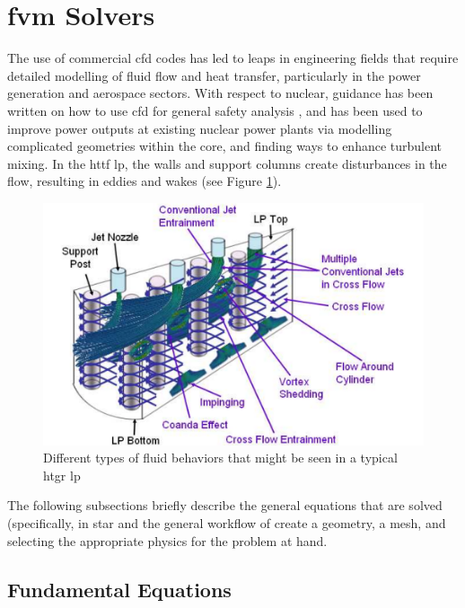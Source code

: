 \documentclass[double,12pt]{beavtex}
\begin{document}
\section{\acrshort{fvm} Solvers}

The use of commercial \acrshort{cfd} codes has led to leaps in engineering fields that require detailed modelling of fluid flow and heat transfer, particularly in the power generation and aerospace sectors. With respect to nuclear, guidance has been written on how to use \acrshort{cfd} for general safety analysis \cite{johnson_pointer}, and has been used to improve power outputs at existing nuclear power plants \cite{wang_wang_tian_qiu_su_2021} via modelling complicated geometries within the core, and finding ways to enhance turbulent mixing. In the \acrshort{httf} \acrshort{lp}, the walls and support columns create disturbances in the flow, resulting in eddies and wakes (see Figure \ref{fig:LP_Flow_Behavior}).
\begin{figure}[!ht]
    \begin{center}
    	\includegraphics[width=13cm]{Figures/Flow_Behavior_LP.PNG}
    	\caption{Different types of fluid behaviors that might be seen in a typical \acrshort{htgr} \acrshort{lp} \cite{rodriguez_2010}}
    	\label{fig:LP_Flow_Behavior}
    	\end{center}
\end{figure}
The following subsections briefly describe the general equations that are solved (specifically, in \acrshort{star} and the general workflow of create a geometry, a mesh, and selecting the appropriate physics for the problem at hand.

\subsection{Fundamental Equations}
\end{document}
